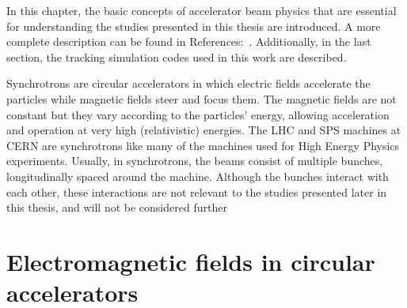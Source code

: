 In this chapter, the basic concepts of accelerator beam physics that are essential for understanding the studies presented in this thesis are introduced. A more complete description can be found in References:~\cite{wolski2014, Wiedemann:1083415, Lee:1425444}. Additionally, in the last section, the tracking simulation codes used in this work are described.

Synchrotrons are circular accelerators in which electric fields accelerate the particles while magnetic fields steer and focus them. The magnetic fields are not constant but they vary according to the particles' energy, allowing acceleration and operation at very high (relativistic) energies. The LHC and SPS machines at CERN are synchrotrons like many of the machines used for High Energy Physics experiments. Usually, in synchrotrons, the beams consist of multiple bunches, longitudinally spaced around the machine.  Although the bunches interact with each other, these interactions are not relevant to the studies presented later in this thesis, and will not be considered further




\section{Electromagnetic fields in circular accelerators}\label{sec:EM_fields_intro}



